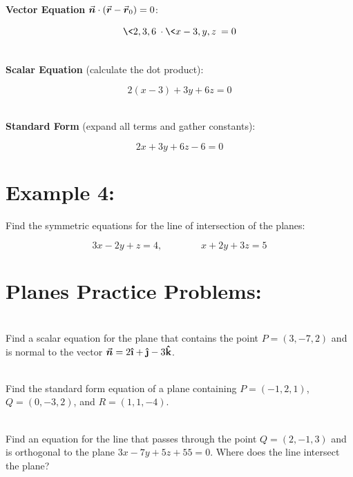 \textbf{Vector Equation} \(\n \cdot (\r- \r_0) = 0\):

\[\<2, 3, 6\> \cdot \<x-3, y, z\> = 0\]

~\\

\textbf{Scalar Equation} (calculate the dot product):

\[2(x-3) + 3y + 6z = 0  \]

~\\

\textbf{Standard Form} (expand all terms and gather constants):

\[
2x + 3y + 6z - 6 = 0
\]



\section*{Example 4:}

Find the symmetric equations for the line of intersection of the planes:

\[
3x-2y+z = 4, \qquad \qquad x+2y+3z = 5
\]

\pagebreak


\section*{Planes Practice Problems:}


\begin{list}{\bf{Problem : }}{}

\addtocounter{prob}{3}

\item ~\\
Find a scalar equation for the plane that contains the point \(P=(3,-7,2)\) and is normal to the vector \(\vec{n} = 2\ihat + \jhat - 3\khat\).

\vfill

\item ~\\
Find the standard form equation of a plane containing \(P=(-1,2,1)\), \(Q=(0,-3,2)\), and \(R= (1,1,-4)\).

\vfill


\item ~\\
 Find an equation for the line that passes through the point \(Q=(2,-1,3)\) and is orthogonal to the plane \(3x-7y+5z+55 = 0\).  Where does the line intersect the plane?

\vfill

\end{list}


